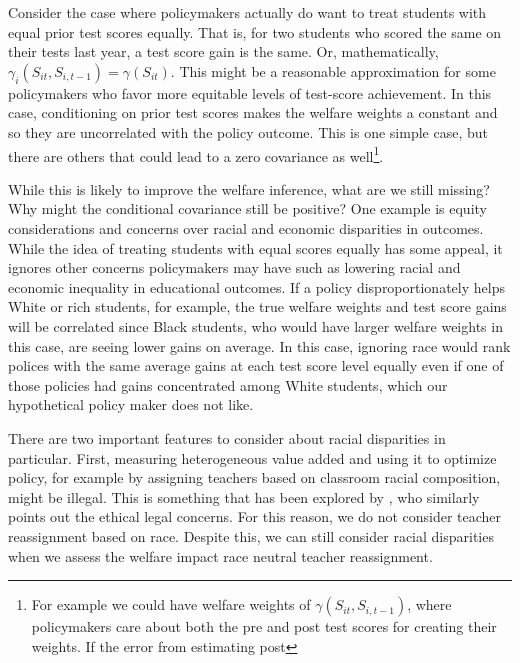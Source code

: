 \documentclass[12pt]{article}
\theoremstyle{definition}
\theoremstyle{definition}
\theoremstyle{definition}
\theoremstyle{definition}
\begin{document}
    Consider the case where policymakers actually do want to treat students with equal prior test scores equally. That is, for two students who scored the same on their tests last year, a test score gain is the same. Or, mathematically, $\gamma_i(S_{it}, S_{i,t-1}) = \gamma(S_{it})$. This might be a reasonable approximation for some policymakers who favor more equitable levels of test-score achievement. In this case, conditioning on prior test scores makes the welfare weights a constant and so they are uncorrelated with the policy outcome. This is one simple case, but there are others that could lead to a zero covariance as well\footnote{For example we could have welfare weights of $\gamma(S_{it}, S_{i,t-1})$, where policymakers care about both the pre and post test scores for creating their weights. If the error from estimating post }.  
    
    While this is likely to improve the welfare inference, what are we still missing? Why might the conditional covariance still be positive? One example is equity considerations and concerns over racial and economic disparities in outcomes. While the idea of treating students with equal scores equally has some appeal, it ignores other concerns policymakers may have such as lowering racial and economic inequality in educational outcomes. If a policy disproportionately helps White or rich students, for example, the true welfare weights and test score gains will be correlated since Black students, who would have larger welfare weights in this case, are seeing lower gains on average. In this case, ignoring race would rank polices with the same average gains at each test score level equally even if one of those policies had gains concentrated among White students, which our hypothetical policy maker does not like.

    There are two important features to consider about racial disparities in particular. First, measuring heterogeneous value added and using it to optimize policy, for example by assigning teachers based on classroom racial composition, might be illegal. This is something that has been explored by \citet{Delgado2020}, who similarly points out the ethical legal concerns. For this reason, we do not consider teacher reassignment based on race. Despite this, we can still consider racial disparities when we assess the welfare impact race neutral teacher reassignment. 
    
\end{document}
